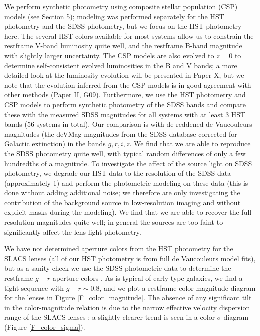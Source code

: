 \documentclass[iop]{emulateapj}
\begin{document}
We perform synthetic photometry using composite stellar population (CSP) models (see Section 5); modeling was performed separately for the HST photometry and the SDSS photometry, but we focus on the HST photometry here. The several HST colors available for most systems allow us to constrain the restframe V-band luminosity quite well, and the restframe B-band magnitude with slightly larger uncertainty. The CSP models are also evolved to $z = 0$ to determine self-consistent evolved luminosities in the B and V bands; a more detailed look at the luminosity evolution will be presented in Paper X, but we note that the evolution inferred from the CSP models is in good agreement with other methods (Paper II, G09). Furthermore, we use the HST photometry and CSP models to perform synthetic photometry of the SDSS bands and compare these with the measured SDSS magnitudes for all systems with at least 3 HST bands (56 systems in total). Our comparison is with de-reddened de Vaucouleurs magnitudes (the deVMag magnitudes from the SDSS database corrected for Galactic extinction) in the bands $g,r,i,z$. We find that we are able to reproduce the SDSS photometry quite well, with typical random differences of only a few hundredths of a magnitude. To investigate the affect of the source light on SDSS photometry, we degrade our HST data to the resolution of the SDSS data (approximately 1) and perform the photometric modeling on these data (this is done without adding additional noise; we therefore are only investigating the contribution of the background source in low-resolution imaging and without explicit masks during the modeling). We find that we are able to recover the full-resolution magnitudes quite well; in general the sources are too faint to significantly affect the lens light photometry.

We have not determined aperture colors from the HST photometry for the SLACS lenses (all of our HST photometry is from full de Vaucouleurs model fits), but as a sanity check we use the SDSS photometric data to determine the restframe $g-r$ aperture colors \citep[here we use the SDSS modelMag magnitudes to determine the colors, e.g.,][]{stoughton}. As is typical of early-type galaxies, we find a tight sequence with $g-r \sim0.8$, and we plot a restframe color-magnitude diagram for the lenses in Figure \ref{F_color_magnitude}. The absence of any significant tilt in the color-magnitude relation is due to the narrow effective velocity dispersion range of the SLACS lenses \citep[comparable in width to the `constant velocity dispersion' bins used by other authors, e.g.,][]{bernardi,graves}; a slightly clearer trend is seen in a color-$\sigma$ diagram (Figure \ref{F_color_sigma}).
\end{document}
